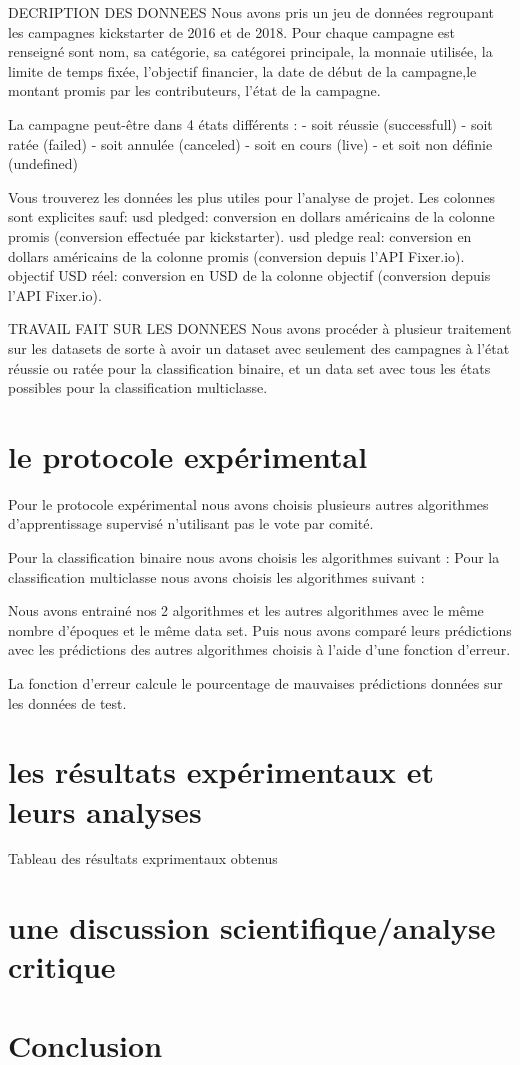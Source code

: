 \documentclass{article}
\begin{document}
DECRIPTION DES DONNEES 
Nous avons pris un jeu de données regroupant les campagnes kickstarter de 2016 et de 2018. 
Pour chaque campagne est renseigné sont nom, sa catégorie, sa catégorei principale, la monnaie utilisée, la limite de temps fixée, l'objectif financier, la date de début de la campagne,le montant promis par les contributeurs, l'état de la campagne. 

La campagne peut-être dans 4 états différents : 
- soit réussie (successfull)
- soit ratée (failed)
- soit annulée (canceled)
- soit en cours (live)
- et soit non définie (undefined)

Vous trouverez les données les plus utiles pour l'analyse de projet. Les colonnes sont explicites sauf:
usd pledged: conversion en dollars américains de la colonne promis (conversion effectuée par kickstarter).
usd pledge real: conversion en dollars américains de la colonne promis (conversion depuis l'API Fixer.io).
objectif USD réel: conversion en USD de la colonne objectif (conversion depuis l'API Fixer.io).

TRAVAIL FAIT SUR LES DONNEES
Nous avons procéder à plusieur traitement sur les datasets de sorte à avoir un dataset avec seulement des campagnes à l'état réussie ou ratée pour la classification binaire, et un data set avec tous les états possibles pour la classification multiclasse. 

\section{le protocole expérimental}
Pour le protocole expérimental nous avons choisis plusieurs autres algorithmes d'apprentissage supervisé n'utilisant pas le vote par comité. 

Pour la classification binaire nous avons choisis les algorithmes suivant : 
Pour la classification multiclasse nous avons choisis les algorithmes suivant : 

Nous avons entrainé nos 2 algorithmes et les autres algorithmes avec le même nombre d'époques et le même data set. 
Puis nous avons comparé leurs prédictions avec les prédictions des autres algorithmes choisis à l'aide d'une fonction d'erreur.

La fonction d'erreur calcule le pourcentage de mauvaises prédictions données sur les données de test. 

\section{les résultats expérimentaux et leurs analyses}
Tableau des résultats exprimentaux obtenus

\section{une discussion scientifique/analyse critique}

\section{Conclusion}



\end{document}
